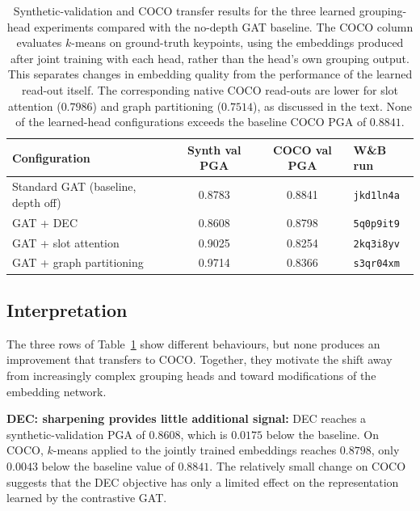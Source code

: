 \begin{table}[H]
\centering
\caption[Synthetic-validation and COCO transfer results for the three learned grouping-head experiments compared with the no-depth GAT baseline.]{Synthetic-validation and COCO transfer results for the three
learned grouping-head experiments compared with the no-depth GAT
baseline. The COCO column evaluates $k$-means on ground-truth keypoints,
using the embeddings produced after joint training with each head, rather than the head's
own grouping output. This separates changes in embedding quality from
the performance of the learned read-out itself. The corresponding
native COCO read-outs are lower for slot attention ($0.7986$) and
graph partitioning ($0.7514$), as discussed in the text. None of the
learned-head configurations exceeds the baseline COCO PGA of $0.8841$.}
\label{tab:learned_heads_headline}
\tablesize
\begin{tabular}{lccl}
\toprule
Configuration & Synth val PGA & COCO val PGA & W\&B run \\
\midrule
Standard GAT (baseline, depth off)
    & 0.8783 & 0.8841 & \texttt{jkd1ln4a} \\
\midrule
GAT + DEC
    & 0.8608 & 0.8798 & \texttt{5q0p9it9} \\
GAT + slot attention
    & 0.9025 & 0.8254 & \texttt{2kq3i8yv} \\
GAT + graph partitioning
    & 0.9714 & 0.8366 & \texttt{s3qr04xm} \\
\bottomrule
\end{tabular}
\end{table}

\subsection{Interpretation}
\label{sec_res_learned_heads_discussion}

The three rows of Table~\ref{tab:learned_heads_headline} show different
behaviours,
but none produces an improvement that transfers to COCO.
Together, they motivate the shift away from increasingly complex
grouping heads and toward modifications of the embedding network.

\textbf{DEC: sharpening provides little additional signal:}
DEC reaches a synthetic-validation PGA of $0.8608$,
which is $0.0175$ below the baseline.
On COCO, $k$-means applied to the jointly trained embeddings
reaches $0.8798$,
only $0.0043$ below the baseline value of $0.8841$.
The relatively small change on COCO suggests that the DEC objective
has only a limited effect on the representation learned by the
contrastive GAT.


